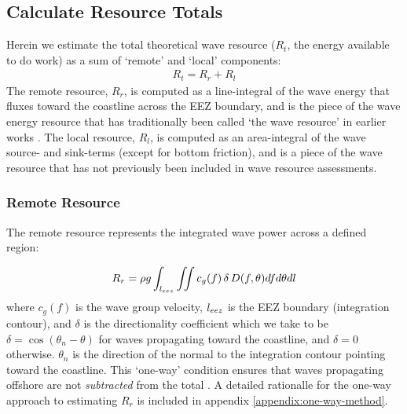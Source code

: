 \subsection{Calculate Resource Totals} \label{sec:method:calc}

Herein we estimate the total theoretical wave resource ($R_t$, the energy available to do work) as a sum of `remote' and `local' components:
\begin{align}
  R_t = R_r + R_l
\end{align}
The remote resource, $R_r$, is computed as a line-integral of the wave energy that fluxes toward the coastline across the EEZ boundary, and is the piece of the wave energy resource that has traditionally been called `the wave resource' in earlier works \citep{gunnQuantifyingGlobalWave2012,EPRIwaveresource2011}. The local resource, $R_l$, is computed as an area-integral of the wave source- and sink-terms (except for bottom friction), and is a piece of the wave resource that has not previously been included in wave resource assessments.

\subsubsection{Remote Resource} \label{sec:method:calc:remote}

The remote resource represents the integrated wave power across a defined region:

\begin{align}
  R_r = \rho g \int_{l_{eez}}\iint c_g(f) \, \delta \, D(f,\theta) df d\theta dl
\end{align}
where $c_g(f)$ is the wave group velocity, $l_{eez}$ is the EEZ boundary (integration contour), and $\delta$ is the directionality coefficient which we take to be $\delta = \cos(\theta_n - \theta)$ for waves propagating toward the coastline, and $\delta = 0$ otherwise. $\theta_n$ is the direction of the normal to the integration contour pointing toward the coastline. This `one-way' condition ensures that waves propagating offshore are not {\em subtracted} from the total \citep[]{gunnQuantifyingGlobalWave2012}. A detailed rationalle for the one-way approach to estimating $R_r$ is included in appendix \ref{appendix:one-way-method}.


